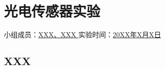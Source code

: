 \section{光电传感器实验}

\begin{center}
    {
        小组成员：\underline{\quad XXX、XXX \quad} \quad
        实验时间：\underline{\quad 20XX年X月X日 \quad}
    }
\end{center}

\subsection{XXX}

\newpage